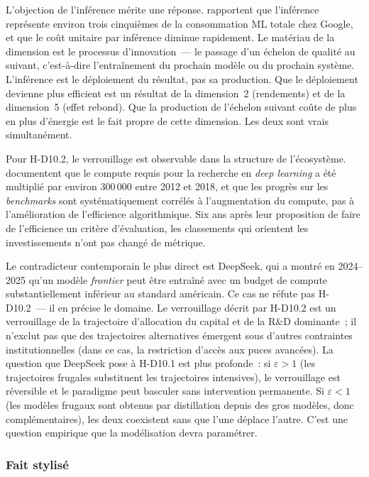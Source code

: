 L'objection de l'inférence mérite une réponse. \textcite{patterson_carbon_2021} rapportent que l'inférence représente environ trois cinquièmes de la consommation ML totale chez Google, et que le coût unitaire par inférence diminue rapidement. Le matériau de la dimension est le processus d'innovation~--- le passage d'un échelon de qualité au suivant, c'est-à-dire l'entraînement du prochain modèle ou du prochain système. L'inférence est le déploiement du résultat, pas sa production. Que le déploiement devienne plus efficient est un résultat de la dimension~2 (rendements) et de la dimension~5 (effet rebond). Que la production de l'échelon suivant coûte de plus en plus d'énergie est le fait propre de cette dimension. Les deux sont vrais simultanément.

Pour H-D10.2, le verrouillage est observable dans la structure de l'écosystème. \textcite{schwartz_green_2020} documentent que le compute requis pour la recherche en \emph{deep learning} a été multiplié par environ 300\,000 entre 2012 et 2018, et que les progrès sur les \emph{benchmarks} sont systématiquement corrélés à l'augmentation du compute, pas à l'amélioration de l'efficience algorithmique. Six ans après leur proposition de faire de l'efficience un critère d'évaluation, les classements qui orientent les investissements n'ont pas changé de métrique.

Le contradicteur contemporain le plus direct est DeepSeek, qui a montré en 2024--2025 qu'un modèle \emph{frontier} peut être entraîné avec un budget de compute substantiellement inférieur au standard américain. Ce cas ne réfute pas H-D10.2~--- il en précise le domaine. Le verrouillage décrit par H-D10.2 est un verrouillage de la trajectoire d'allocation du capital et de la R\&D dominante~; il n'exclut pas que des trajectoires alternatives émergent sous d'autres contraintes institutionnelles (dans ce cas, la restriction d'accès aux puces avancées). La question que DeepSeek pose à H-D10.1 est plus profonde~: si $\varepsilon > 1$ (les trajectoires frugales substituent les trajectoires intensives), le verrouillage est réversible et le paradigme peut basculer sans intervention permanente. Si $\varepsilon < 1$ (les modèles frugaux sont obtenus par distillation depuis des gros modèles, donc complémentaires), les deux coexistent sans que l'une déplace l'autre. C'est une question empirique que la modélisation devra paramétrer.


\subsubsection{Fait stylisé}

